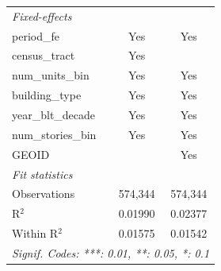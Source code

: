 \begin{tabular}{lcc}
   \midrule
   \emph{Fixed-effects}\\
   period\_fe                                                          & Yes                   & Yes\\  
   census\_tract                                                       & Yes                   & \\  
   num\_units\_bin                                                     & Yes                   & Yes\\  
   building\_type                                                      & Yes                   & Yes\\  
   year\_blt\_decade                                                   & Yes                   & Yes\\  
   num\_stories\_bin                                                   & Yes                   & Yes\\  
   GEOID                                                               &                       & Yes\\  
   \midrule
   \emph{Fit statistics}\\
   Observations                                                        & 574,344               & 574,344\\  
   R$^2$                                                               & 0.01990               & 0.02377\\  
   Within R$^2$                                                        & 0.01575               & 0.01542\\  
   \midrule \midrule
   \multicolumn{3}{l}{\emph{Signif. Codes: ***: 0.01, **: 0.05, *: 0.1}}\\
\end{tabular}
\par\endgroup
\begingroup
\centering
